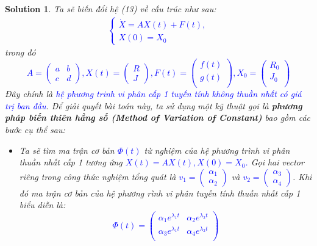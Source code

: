 \documentclass[a4paper]{article}
\newtheorem*{sol}{Solution}
\begin{document}
\begin{sol}
    Ta sẽ biến đổi hệ (13) về cấu trúc như sau: 
    \textcolor{blue}{\begin{align}\label{eq13-1}
        \begin{cases}
            \dot{X} = AX(t) + F(t), \\ 
            X(0) = X_0
        \end{cases}\tag{13.1}
    \end{align}}
    trong đó \textcolor{blue}{$$A=\begin{pmatrix}
   a &b\\
   c &d
\end{pmatrix},X(t)=\begin{pmatrix}
   R\\
   J
\end{pmatrix}, F(t)=\begin{pmatrix}
   f(t)\\
   g(t)\\
\end{pmatrix}, X_0 = \begin{pmatrix}
    R_0 \\
    J_0 \\
\end{pmatrix}$$}
Đây chính là \textit{\textcolor{blue}{hệ phương trinh vi phân cấp 1 tuyến tính không thuần nhất có giá trị ban đầu}}. Để giải quyết bài toán này, ta sử dụng một kỹ thuật gọi là \textit{\textbf{phương pháp biến thiên hằng số (Method of Variation of Constant)}} bao gồm các bước cụ thể sau: 

\begin{itemize}
 \item Ta sẽ tìm ma trận cơ bản \textcolor{blue}{$\Phi(t)$} từ nghiệm của hệ phương trình vi phân thuần nhất cấp 1 tương ứng \textcolor{blue}{$X(t) = AX(t), X(0) = X_0$. }
 \newline
 Gọi hai vector riêng trong công thức nghiệm tổng quát là \textcolor{blue}{$v_1 = \begin{pmatrix}
     \alpha_1 \\
     \alpha_2
 \end{pmatrix}$} và \textcolor{blue}{$v_2 = \begin{pmatrix}
     \alpha_3 \\
     \alpha_4
 \end{pmatrix}$}. Khi đó ma trận cơ bản của hệ phương rình vi phân tuyến tính thuần nhất cấp 1 biểu diễn là: 
 \textcolor{blue}{$$\Phi(t) = \begin{pmatrix}
     \alpha_1 e^{\lambda_1 t} & \alpha_2 e^{\lambda_2 t} \\
     \alpha_3 e^{\lambda_1 t} & \alpha_4 e^{\lambda_2 t} \\ 
 \end{pmatrix}$$}


\end{itemize}
\end{sol}
\end{document}
